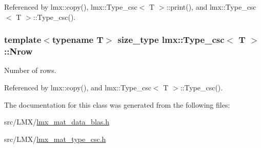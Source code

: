 Referenced by lmx\-::copy(), lmx\-::\-Type\-\_\-csc$<$ T $>$\-::print(), and lmx\-::\-Type\-\_\-csc$<$ T $>$\-::\-Type\-\_\-csc().

\hypertarget{classlmx_1_1Type__csc_a2c5ef8a3a2cd3a79d7b747f8cace105f}{
\subsubsection[{Nrow}]{\setlength{\rightskip}{0pt plus 5cm}template$<$typename T$>$ {\bf size\-\_\-type} {\bf lmx\-::\-Type\-\_\-csc}$<$ T $>$\-::Nrow}}\label{classlmx_1_1Type__csc_a2c5ef8a3a2cd3a79d7b747f8cace105f}
Number of rows. 

Referenced by lmx\-::copy(), and lmx\-::\-Type\-\_\-csc$<$ T $>$\-::\-Type\-\_\-csc().



The documentation for this class was generated from the following files\-:\begin{DoxyCompactItemize}
\item 
src/\-L\-M\-X/\hyperlink{lmx__mat__data__blas_8h}{lmx\-\_\-mat\-\_\-data\-\_\-blas.\-h}\item 
src/\-L\-M\-X/\hyperlink{lmx__mat__type__csc_8h}{lmx\-\_\-mat\-\_\-type\-\_\-csc.\-h}\end{DoxyCompactItemize}
